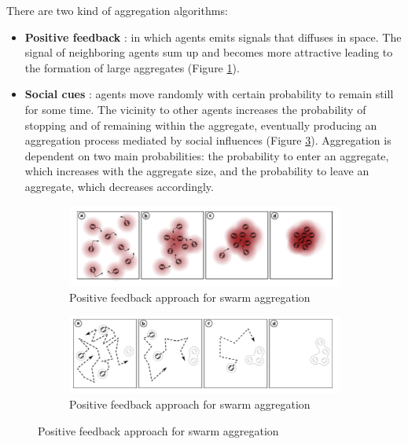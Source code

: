 \documentclass[10pt,a4paper]{article}
\begin{document}
There are two kind of aggregation algorithms:
\begin{itemize}
\item \textbf{Positive feedback} : in which agents emits signals that diffuses in space. The signal of neighboring agents sum up and becomes more attractive leading to the formation of large aggregates (Figure \ref{fig:positive_feed}).
\item \textbf{Social cues} : agents move randomly with certain probability to remain still for some time. The vicinity to other agents increases the probability of stopping and of remaining within the aggregate, eventually producing an aggregation process mediated by social influences (Figure \ref{fig:social_cues}). Aggregation is dependent on two main probabilities: the probability to enter an aggregate, which increases with the aggregate size, and the probability to leave an aggregate, which decreases accordingly.
\end{itemize}

\begin{figure}[H]
    \centering
    \begin{subfigure}[b]{0.7\textwidth}
        \centering
        \includegraphics[width=\textwidth]{images/positivie_feedback.png}
        \caption{Positive feedback approach for swarm aggregation}
        \label{fig:positive_feed}
    \end{subfigure}
    \begin{subfigure}[b]{0.7\textwidth}
        \centering
        \includegraphics[width=\textwidth]{images/social_cues.png}
        \caption{Positive feedback approach for swarm aggregation}
        \label{fig:social_cues}
    \end{subfigure}
\end{figure}
\end{document}
